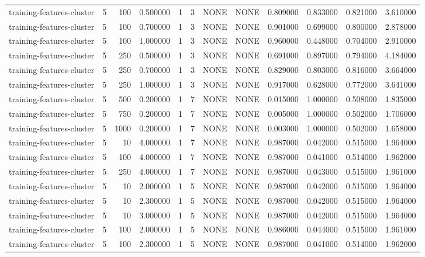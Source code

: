 \begin{tabular}{lrrrllllrrrr}
training-features-cluster & 5 & 100 & 0.500000 & 1 & 3 & NONE & NONE & 0.809000 & 0.833000 & 0.821000 & 3.610000 \\
training-features-cluster & 5 & 100 & 0.700000 & 1 & 3 & NONE & NONE & 0.901000 & 0.699000 & 0.800000 & 2.878000 \\
training-features-cluster & 5 & 100 & 1.000000 & 1 & 3 & NONE & NONE & 0.960000 & 0.448000 & 0.704000 & 2.910000 \\
training-features-cluster & 5 & 250 & 0.500000 & 1 & 3 & NONE & NONE & 0.691000 & 0.897000 & 0.794000 & 4.184000 \\
training-features-cluster & 5 & 250 & 0.700000 & 1 & 3 & NONE & NONE & 0.829000 & 0.803000 & 0.816000 & 3.664000 \\
training-features-cluster & 5 & 250 & 1.000000 & 1 & 3 & NONE & NONE & 0.917000 & 0.628000 & 0.772000 & 3.641000 \\
training-features-cluster & 5 & 500 & 0.200000 & 1 & 7 & NONE & NONE & 0.015000 & 1.000000 & 0.508000 & 1.835000 \\
training-features-cluster & 5 & 750 & 0.200000 & 1 & 7 & NONE & NONE & 0.005000 & 1.000000 & 0.502000 & 1.706000 \\
training-features-cluster & 5 & 1000 & 0.200000 & 1 & 7 & NONE & NONE & 0.003000 & 1.000000 & 0.502000 & 1.658000 \\
training-features-cluster & 5 & 10 & 4.000000 & 1 & 7 & NONE & NONE & 0.987000 & 0.042000 & 0.515000 & 1.964000 \\
training-features-cluster & 5 & 100 & 4.000000 & 1 & 7 & NONE & NONE & 0.987000 & 0.041000 & 0.514000 & 1.962000 \\
training-features-cluster & 5 & 250 & 4.000000 & 1 & 7 & NONE & NONE & 0.987000 & 0.043000 & 0.515000 & 1.961000 \\
training-features-cluster & 5 & 10 & 2.000000 & 1 & 5 & NONE & NONE & 0.987000 & 0.042000 & 0.515000 & 1.964000 \\
training-features-cluster & 5 & 10 & 2.300000 & 1 & 5 & NONE & NONE & 0.987000 & 0.042000 & 0.515000 & 1.964000 \\
training-features-cluster & 5 & 10 & 3.000000 & 1 & 5 & NONE & NONE & 0.987000 & 0.042000 & 0.515000 & 1.964000 \\
training-features-cluster & 5 & 100 & 2.000000 & 1 & 5 & NONE & NONE & 0.986000 & 0.044000 & 0.515000 & 1.961000 \\
training-features-cluster & 5 & 100 & 2.300000 & 1 & 5 & NONE & NONE & 0.987000 & 0.041000 & 0.514000 & 1.962000 \\

\end{tabular}
